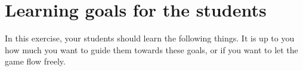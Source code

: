 \chapter{Learning goals for the students}

In this exercise, your students should learn the following things.
It is up to you how much you want to guide them towards these goals, or if you want to let the game flow freely.
